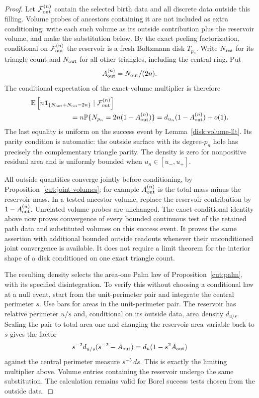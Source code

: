 \begin{proof}
Let $\mathcal F_{\rm out}^{(n)}$ contain the selected birth data and all
discrete data outside this filling.  Volume probes of ancestors containing
it are not included as extra conditioning: write each such volume as its
outside contribution plus the reservoir volume, and make the substitution
below.  By the exact peeling factorization, conditional on
$\mathcal F_{\rm out}^{(n)}$ the reservoir is a fresh Boltzmann disk $T_{p_n}$.
Write $N_{\rm res}$ for its triangle count and $N_{\rm out}$ for all other
triangles, including the central ring.  Put
\[
 A_{\rm out}^{(n)}=N_{\rm out}/(2n).
\]
The conditional expectation of the exact-volume multiplier is therefore
\begin{align*}
 &\mathbb E\left[n\mathbf 1_{\{N_{\rm out}+N_{\rm res}=2n\}}
                           \mid\mathcal F_{\rm out}^{(n)}\right]\\
 &\hspace{2cm}=n\mathbb P\{N_{p_n}=2n(1-A_{\rm out}^{(n)})\}
   =d_{u_n}(1-A_{\rm out}^{(n)})+o(1).
\end{align*}
The last equality is uniform on the success event by
Lemma~\ref{disk:volume-llt}.  Its parity condition is automatic: the outside
surface with its degree-$p_n$ hole has precisely the complementary triangle
parity.  The density is zero for nonpositive residual area and is uniformly
bounded when $u_n\in[u_-,u_+]$.

All outside quantities converge jointly before conditioning, by
Proposition~\ref{cut:joint-volumes}; for example $A_{\rm out}^{(n)}$ is the
total mass minus the reservoir mass.  In a tested ancestor volume, replace
the reservoir contribution by $1-A_{\rm out}^{(n)}$.  Unrelated volume probes
are unchanged.  The exact conditional identity above now proves convergence
of every bounded continuous test of the retained path data and substituted
volumes on this success event.  It proves the same assertion with additional
bounded outside readouts whenever their unconditioned joint convergence is
available.  It does not require a limit theorem for the interior shape of a
disk conditioned on one exact triangle count.


The resulting density selects the area-one Palm law of
Proposition~\ref{cut:palm}, with its specified disintegration.  To verify
this without choosing a conditional law at a null event, start from the
unit-perimeter pair and integrate the central perimeter $s$.  Use bars for
areas in the unit-perimeter pair.  The reservoir has relative perimeter
$u/s$ and, conditional on its outside data, area density $d_{u/s}$.
Scaling the pair to total area one and changing the reservoir-area variable
back to $s$ gives the factor
\[
 s^{-2}d_{u/s}(s^{-2}-\bar A_{\rm out})
       =d_u(1-s^2\bar A_{\rm out})
\]
against the central perimeter measure $s^{-5}\,ds$.  This is exactly the
limiting multiplier above.  Volume entries containing the reservoir undergo
the same substitution.  The calculation remains valid for Borel success
tests chosen from the outside data.


\end{proof}
